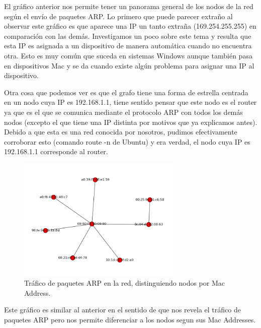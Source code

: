 \documentclass{article}
\theoremstyle{definition}
\theoremstyle{remark}
\begin{document}
El gráfico anterior nos permite tener un panorama general de los nodos de la red según el envío de paquetes ARP. Lo primero que puede parecer extraño al observar este gráfico es que aparece una IP un tanto extraña (169.254.255.255) en comparación con las demás. Investigamos un poco sobre este tema y resulta que esta IP es asignada a un dispositivo de manera automática cuando no encuentra otra. Esto es muy común que suceda en sistemas Windows aunque también pasa en dispositivos Mac y se da cuando existe algún problema para asignar una IP al dispositivo.
\par Otra cosa que podemos ver es que el grafo tiene una forma de estrella centrada en un nodo cuya IP es 192.168.1.1, tiene sentido pensar que este nodo es el router ya que es el que se comunica mediante el protocolo ARP con todos los demás nodos (excepto el que tiene una IP distinta por motivos que ya explicamos antes). Debido a que esta es una red conocida por nosotros, pudimos efectivamente corroborar esto (comando route -n de Ubuntu) y era verdad, el nodo cuya IP es 192.168.1.1 corresponde al router.

\begin{figure}[H]
    \centering
    \includegraphics[width=0.70\textwidth]{../captures/CasaGerman/conn_mac.png}
    \caption{Tráfico de paquetes ARP en la red, distinguiendo nodos por Mac Address.}
    \label{fig:mesh1}
\end{figure}

Este gráfico es similar al anterior en el sentido de que nos revela el tráfico de paquetes ARP pero nos permite diferenciar a los nodos segun sus Mac Addresses.
\end{document}
